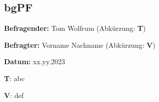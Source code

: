\subsection{bgPF} \label{T_bgPF}

\textbf{Befragender:} Tom Wolfrum (Abkürzung: \textbf{T})

\textbf{Befragter:} Vorname Nachname (Abkürzung: \textbf{V})

\textbf{Datum:} xx.yy.2023

\begin{list}{X:}{\setlength{\labelsep}{5mm}}
    \linenumbers[1]
    \item[\textbf{T}:] abc
    \item[\textbf{V}:] def 
\end{list}